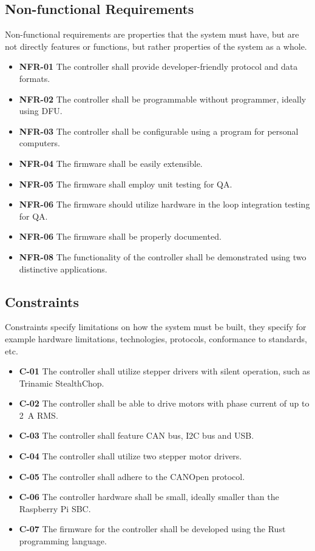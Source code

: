 \subsection{Non-functional Requirements}
\label{subsec:nonfunc_req}
Non-functional requirements are properties that the system must have, but are not directly features or functions, but rather properties of the system as a whole.

\begin{itemize}
    \item \textbf{NFR-01} The controller shall provide developer-friendly protocol and data formats.
    \item \textbf{NFR-02} The controller shall be programmable without programmer, ideally using DFU.
    \item \textbf{NFR-03} The controller shall be configurable using a program for personal computers.
    \item \textbf{NFR-04} The firmware shall be easily extensible.
    \item \textbf{NFR-05} The firmware shall employ unit testing for QA.
    \item \textbf{NFR-06} The firmware should utilize hardware in the loop integration testing for QA.
    \item \textbf{NFR-06} The firmware shall be properly documented.
    \item \textbf{NFR-08} The functionality of the controller shall be demonstrated using two distinctive applications.
\end{itemize}

\subsection{Constraints}
\label{subsec:constraints}
Constraints specify limitations on how the system must be built, they specify for example hardware limitations, technologies, protocols, conformance to standards, etc.

\begin{itemize}
    \item \textbf{C-01} The controller shall utilize stepper drivers with silent operation, such as Trinamic StealthChop\texttrademark.
    \item \textbf{C-02} The controller shall be able to drive motors with phase current of up to 2~A RMS.
    \item \textbf{C-03} The controller shall feature CAN bus, I2C bus and USB.
    \item \textbf{C-04} The controller shall utilize two stepper motor drivers.
    \item \textbf{C-05} The controller shall adhere to the CANOpen protocol.
    \item \textbf{C-06} The controller hardware shall be small, ideally smaller than the Raspberry Pi SBC.
    \item \textbf{C-07} The firmware for the controller shall be developed using the Rust programming language.
\end{itemize}
